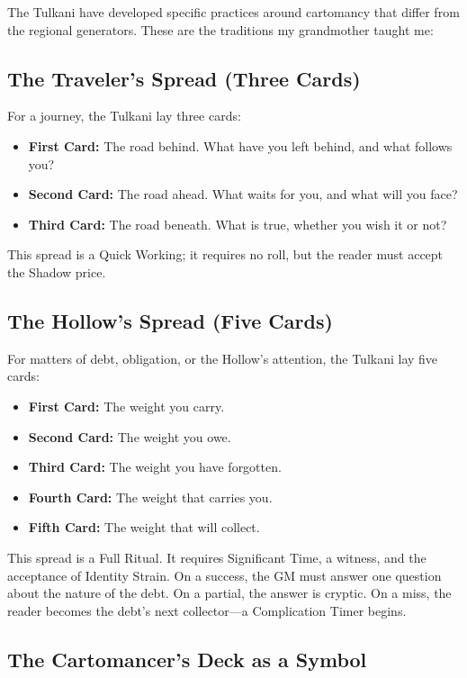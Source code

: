 \documentclass[12pt,oneside]{book}
\begin{document}
The Tulkani have developed specific practices around cartomancy that differ from the regional generators. These are the traditions my grandmother taught me:

\subsection*{The Traveler's Spread (Three Cards)}

For a journey, the Tulkani lay three cards:
\begin{itemize}
    \item \textbf{First Card:} The road behind. What have you left behind, and what follows you?
    \item \textbf{Second Card:} The road ahead. What waits for you, and what will you face?
    \item \textbf{Third Card:} The road beneath. What is true, whether you wish it or not?
\end{itemize}

This spread is a Quick Working; it requires no roll, but the reader must accept the Shadow price.

\subsection*{The Hollow's Spread (Five Cards)}

For matters of debt, obligation, or the Hollow's attention, the Tulkani lay five cards:
\begin{itemize}
    \item \textbf{First Card:} The weight you carry.
    \item \textbf{Second Card:} The weight you owe.
    \item \textbf{Third Card:} The weight you have forgotten.
    \item \textbf{Fourth Card:} The weight that carries you.
    \item \textbf{Fifth Card:} The weight that will collect.
\end{itemize}

This spread is a Full Ritual. It requires Significant Time, a witness, and the acceptance of Identity Strain. On a success, the GM must answer one question about the nature of the debt. On a partial, the answer is cryptic. On a miss, the reader becomes the debt's next collector---a Complication Timer begins.

\subsection*{The Cartomancer's Deck as a Symbol}
\end{document}
